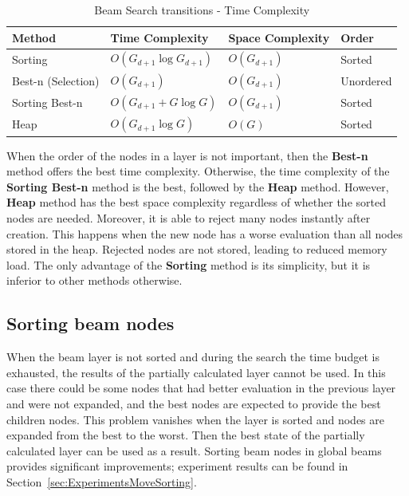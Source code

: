 \documentclass[shortabstract, mgr, english]{iithesis}
\begin{document}
\begin{itemize}
\begin{table}[h]
\centering
\begin{tabular}{llll}
\toprule
\textbf{Method} & \textbf{Time Complexity} & \textbf{Space Complexity} & \textbf{Order} \\
\midrule
Sorting            & $O(G_{d+1} \log G_{d+1})$ & $O(G_{d+1})$ & Sorted     \\
Best-n (Selection) & $O(G_{d+1})$              & $O(G_{d+1})$ & Unordered  \\
Sorting Best-n     & $O(G_{d+1} + G \log G)$   & $O(G_{d+1})$ & Sorted     \\
Heap               & $O(G_{d+1} \log G)$       & $O(G)$       & Sorted     \\
\bottomrule
\end{tabular}
\caption{Beam Search transitions - Time Complexity}
\label{tab:BeamSearchComplexity}
\end{table}

\end{itemize}
When the order of the nodes in a layer is not important, then the \textbf{Best-n} method offers the best time complexity. Otherwise, the time complexity of the \textbf{Sorting Best-n} method is the best, followed by the \textbf{Heap} method. However, \textbf{Heap} method has the best space complexity regardless of whether the sorted nodes are needed. Moreover, it is able to reject many nodes instantly after creation. This happens when the new node has a worse evaluation than all nodes stored in the heap. Rejected nodes are not stored, leading to reduced memory load. The only advantage of the \textbf{Sorting} method is its simplicity, but it is inferior to other methods otherwise.


\subsection{Sorting beam nodes}
\label{subsec:SortingBeamNodes}
When the beam layer is not sorted and during the search the time budget is exhausted, the results of the partially calculated layer cannot be used. In this case there could be some nodes that had better evaluation in the previous layer and were not expanded, and the best nodes are expected to provide the best children nodes. This problem vanishes when the layer is sorted and nodes are expanded from the best to the worst. Then the best state of the partially calculated layer can be used as a result.
Sorting beam nodes in global beams provides significant improvements; experiment results can be found in Section~\ref{sec:ExperimentsMoveSorting}.
\end{document}
